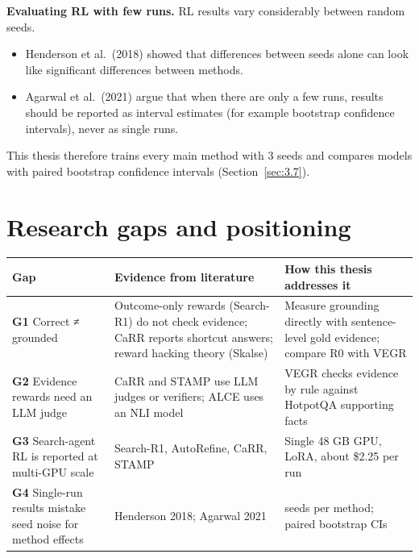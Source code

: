 \textbf{Evaluating RL with few runs.} RL results vary considerably
between random seeds.

\begin{itemize}
\tightlist
\item
  Henderson et al.~(2018) showed that differences between seeds alone
  can look like significant differences between methods.
\item
  Agarwal et al.~(2021) argue that when there are only a few runs,
  results should be reported as interval estimates (for example
  bootstrap confidence intervals), never as single runs.
\end{itemize}

This thesis therefore trains every main method with 3 seeds and compares
models with paired bootstrap confidence intervals
(Section~\ref{sec:3.7}).

\section{Research gaps and positioning}\label{sec:2.9}

{\def\LTcaptype{none} %
\begin{longtable}[]{@{}
  >{\raggedright\arraybackslash}p{}
  >{\raggedright\arraybackslash}p{}
  >{\raggedright\arraybackslash}p{}@{}}
\toprule\noalign{}
\begin{minipage}[b]{\linewidth}\raggedright
Gap
\end{minipage} & \begin{minipage}[b]{\linewidth}\raggedright
Evidence from literature
\end{minipage} & \begin{minipage}[b]{\linewidth}\raggedright
How this thesis addresses it
\end{minipage} \\
\midrule\noalign{}
\endhead
\bottomrule\noalign{}
\endlastfoot
\textbf{G1} Correct ≠ grounded & Outcome-only rewards (Search-R1) do not
check evidence; CaRR reports shortcut answers; reward hacking theory
(Skalse) & Measure grounding directly with sentence-level gold evidence;
compare R0 with VEGR \\
\textbf{G2} Evidence rewards need an LLM judge & CaRR and STAMP use LLM
judges or verifiers; ALCE uses an NLI model & VEGR checks evidence by
rule against HotpotQA supporting facts \\
\textbf{G3} Search-agent RL is reported at multi-GPU scale & Search-R1,
AutoRefine, CaRR, STAMP & Single 48 GB GPU, LoRA, about \$2.25 per
run \\
\textbf{G4} Single-run results mistake seed noise for method effects &
Henderson 2018; Agarwal 2021 & 3 seeds per method; paired bootstrap
CIs \\
\end{longtable}
}

